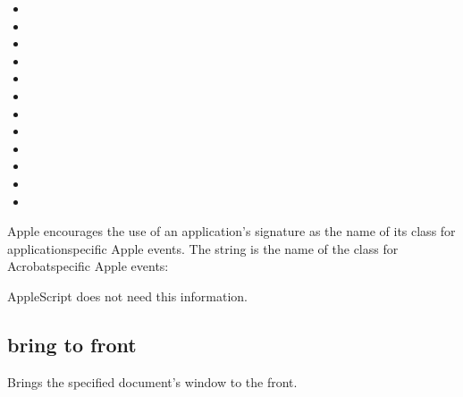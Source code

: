 \documentclass[letterpaper,12pt,english,openany,oneside]{sphinxmanual}
\begin{document}
\begin{itemize}
\item {} 

\item {} 

\item {} 

\item {} 

\item {} 

\item {} 

\item {} 

\item {} 

\item {} 

\item {} 

\item {} 

\item {} 

\end{itemize}

Apple encourages the use of an application’s signature as the name of its class for application\sphinxhyphen{}specific Apple events. The string  is the name of the class for Acrobat\sphinxhyphen{}specific Apple events:

\begin{sphinxVerbatim}[commandchars=\\\{\}]
\end{sphinxVerbatim}

AppleScript does not need this information.




\subsection{bring to front}
\label{\detokenize{IAC_API_AppleEvtObjects:bring-to-front}}
Brings the specified document’s window to the front.
\end{document}
